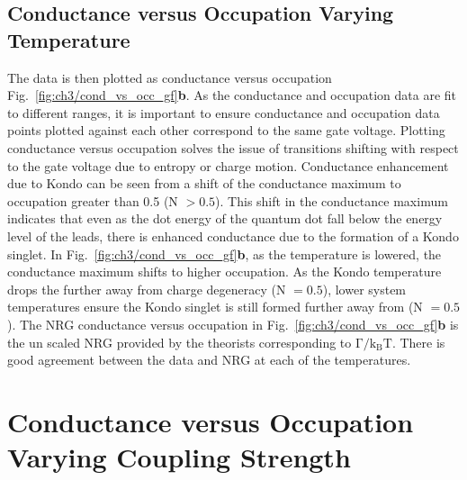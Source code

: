 \subsection{Conductance versus Occupation Varying Temperature}
The data is then plotted as conductance versus occupation Fig.~\ref{fig:ch3/cond_vs_occ_gf}\textbf{b}. As the conductance and occupation data are fit to different ranges, it is important to ensure conductance and occupation data points plotted against each other correspond to the same gate voltage. Plotting conductance versus occupation solves the issue of transitions shifting with respect to the gate voltage due to entropy or charge motion. Conductance enhancement due to Kondo can be seen from a shift of the conductance maximum to occupation greater than 0.5 (N $>0.5$). This shift in the conductance maximum indicates that even as the dot energy of the quantum dot fall below the energy level of the leads, there is enhanced conductance due to the formation of a Kondo singlet.  In Fig.~\ref{fig:ch3/cond_vs_occ_gf}\textbf{b}, as the temperature is lowered, the conductance maximum shifts to higher occupation. As the Kondo temperature drops the further away from charge degeneracy (N $=0.5$), lower system temperatures ensure the Kondo singlet is still formed further away from (N $=0.5$). The NRG conductance versus occupation in Fig.~\ref{fig:ch3/cond_vs_occ_gf}\textbf{b} is the un scaled NRG provided by the theorists corresponding to $\mathrm{\Gamma/k_BT}$. There is good agreement between the data and NRG at each of the temperatures. 




\section{Conductance versus Occupation Varying Coupling Strength}


